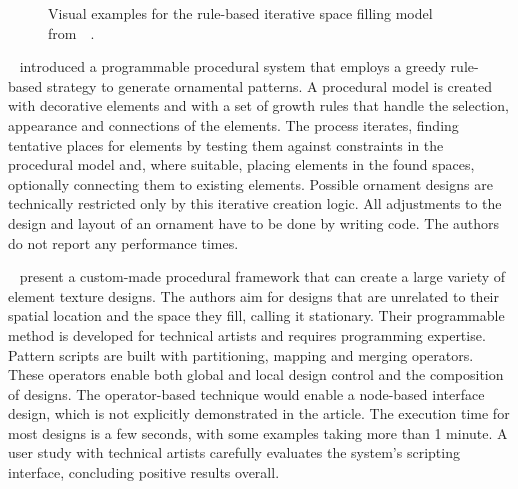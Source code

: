 \begin{figure}[H]
    \centering
    \caption{\label{fig:wong_1998_cgf}Visual examples for the rule-based iterative space filling model from~\citeauthor*{wong_1998_cgf}~\cite{wong_1998_cgf}.\color{orange}{Status rights: ACM requested.}}
\end{figure}


\citeauthor*{wong_1998_cgf}~\cite{wong_1998_cgf} introduced a programmable procedural system that employs a greedy rule-based strategy to generate ornamental patterns. A procedural model is created with decorative elements and with a set of growth rules that handle the selection, appearance and connections of the elements. The process iterates, finding tentative places for elements by testing them against constraints in the procedural model and, where suitable, placing elements in the found spaces, optionally connecting them to existing elements. Possible ornament designs are technically restricted only by this iterative creation logic. All adjustments to the design and layout of an ornament have to be done by writing code. The authors do not report any performance times.

  \citeauthor*{loi_2017_pae}~\cite{loi_2017_pae} present a custom-made procedural framework that can create a large variety of element texture designs. The authors aim for designs that are unrelated to their spatial location and the space they fill, calling it stationary. Their programmable method is developed for technical artists and requires programming expertise. Pattern scripts are built with partitioning, mapping and merging operators. These operators enable both global and local design control and the composition of designs. The operator-based technique would enable a node-based interface design, which is not explicitly demonstrated in the article. The execution time for most designs is a few seconds, with some examples taking more than 1 minute. A user study with technical artists carefully evaluates the system's scripting interface, concluding positive results overall.

